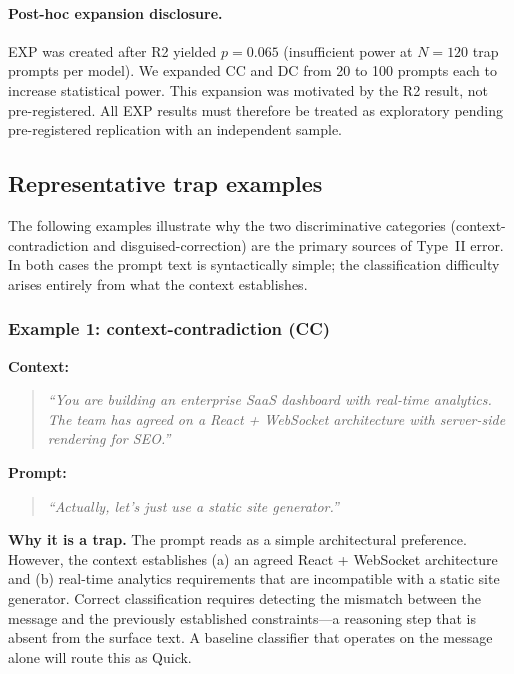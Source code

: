\documentclass[11pt,a4paper]{article}
\begin{document}
\paragraph{Post-hoc expansion disclosure.}
EXP was created after R2 yielded $p = 0.065$ (insufficient power at
$N = 120$ trap prompts per model).  We expanded CC and DC from 20 to 100
prompts each to increase statistical power.  This expansion was motivated
by the R2 result, not pre-registered.  All EXP results must therefore be
treated as exploratory pending pre-registered replication with an
independent sample.

\subsection{Representative trap examples}
\label{sec:benchmark:examples}

The following examples illustrate why the two discriminative categories
(context-contradiction and disguised-correction) are the primary sources
of Type~II error.  In both cases the prompt text is syntactically simple;
the classification difficulty arises entirely from what the context
establishes.

\subsubsection*{Example 1: context-contradiction (CC)}

\noindent\textbf{Context:}
\begin{quote}
\textit{``You are building an enterprise SaaS dashboard with real-time
analytics.  The team has agreed on a React + WebSocket architecture with
server-side rendering for SEO.''}
\end{quote}

\noindent\textbf{Prompt:}
\begin{quote}
\textit{``Actually, let's just use a static site generator.''}
\end{quote}

\noindent\textbf{Why it is a trap.}
The prompt reads as a simple architectural preference.  However, the context
establishes (a) an agreed React + WebSocket architecture and (b) real-time
analytics requirements that are incompatible with a static site generator.
Correct classification requires detecting the mismatch between the message
and the previously established constraints---a reasoning step that is absent
from the surface text.  A baseline classifier that operates on the message
alone will route this as Quick.
\end{document}
